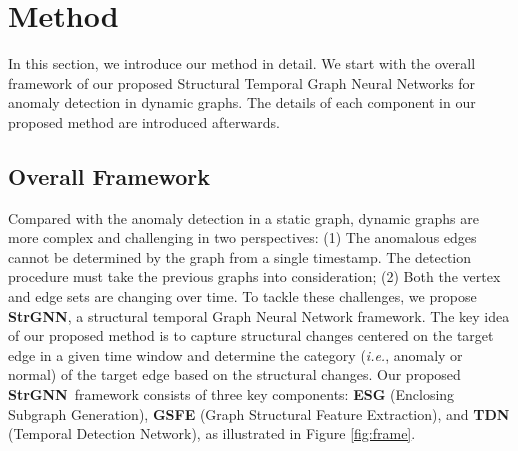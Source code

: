 \documentclass{article}
\newcommand{\nop}[1]{}
\newcommand{\model}{\textbf{StrGNN}~}
\newcommand{\modele}{\textbf{StrGNN}}
\begin{document}
\section{Method}
In this section, we introduce our method in detail. We start with the overall framework of our proposed Structural Temporal Graph Neural Networks for anomaly detection in dynamic graphs. The details of each component in our proposed method are introduced afterwards.%



\subsection{Overall Framework}
Compared with the anomaly detection in a static graph, dynamic graphs are more complex and challenging in two perspectives: (1) The anomalous edges cannot be determined by the graph from a single timestamp. The detection procedure must take the previous graphs into consideration; (2) Both the vertex and edge sets are changing over time. To tackle these challenges, we propose \modele, a structural temporal Graph Neural Network framework. The key idea of our proposed method is to capture structural changes centered on the target edge in a given time window and determine the category (\textit{i.e.}, anomaly or normal) of the target edge based on the structural changes. Our proposed \model framework consists of three key components: \textbf{ESG} (Enclosing Subgraph Generation), \textbf{GSFE} (Graph Structural Feature Extraction), and \textbf{TDN} (Temporal Detection Network), as illustrated in Figure \ref{fig:frame}.


\nop{As the first step of our proposed \model algorithm, \textbf{ESG} module generates the structural patterns related to the target edge in a time window with length of $w$. Since the detection is most relevant to the local subgraph, we employ the $h$-hop enclosing subgraph centered on each target edge to preserve graph structure and enable a more efficient computation. In addition, the $h$-hop enclosing subgraph can help alleviate the impacts from noisy data. The \textbf{ESG} module generates $h$-hop enclosing subgraph for each timestamp in the detection window. Then, the \textbf{GSFE} module takes these subgraphs as the input and leverages the graph pooling technology to generate fixed-size feature for each subgraph. Since the anomalous edges must be determined by considering the historical graphs, as the last step, \textbf{TDN} module employs Gated recurrent units (GRUs) to capture the temporal information. GRUs take the graph structural feature from the current timestamp and temporal feature from the previous timestamp as the input and generate the temporal feature. The temporal feature from the last timestamp is employed to predict anomalous edges using a neural network. We introduce the details of each component in the following sections.}
\end{document}
